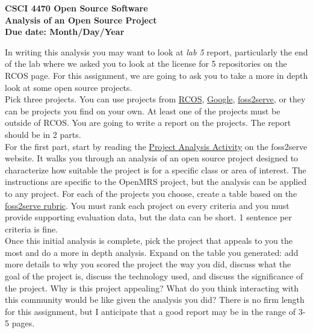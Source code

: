 \documentclass[12pt]{article}
\begin{document}
\begin{center}
\large
\textbf{CSCI 4470 Open Source Software}\\
\textbf{Analysis of an Open Source Project}\\
\textbf{Due date: Month/Day/Year}\\
\end{center}

In writing this analysis you may want to look at \textit{lab 5} report, particularly the end of the lab 
where we asked you to look at the license for 5 repositories on the RCOS page. For this assignment, 
we are going to ask you to take a more in depth look at some open source projects. \\

Pick three projects. You can use projects from \href{https://new.rcos.io}{RCOS}, 
\href{https://opensource.google/projects/}{Google}, \href{http://foss2serve.org/index.php/HFOSS_Projects}{foss2serve}, 
or they can be projects you find on your own. At least one of the projects must be outside of RCOS. 
You are going to write a report on the projects. The report should be in 2 parts. \\

For the first part, start by reading the \href{http://foss2serve.org/index.php/Project_Evaluation_(Activity)}{Project Analysis Activity}
on the foss2serve website. It walks you through an analysis of an open source project designed 
to characterize how suitable the project is for a specific class or area of interest. 
The instructions are specific to the OpenMRS project, but the analysis can be applied to any 
project. For each of the projects you choose, create a table based on the \href{http://foss2serve.org/index.php/Project_Evaluation_Rubric_(Activity)}{foss2serve rubric}. 
You must rank each project on every criteria and you must provide supporting evaluation data, 
but the data can be short. 1 sentence per criteria is fine. \\

Once this initial analysis is complete, pick the project that appeals to you the most and do a 
more in depth analysis. Expand on the table you generated: add more details to why you scored 
the project the way you did, discuss what the goal of the project is, discuss the technology 
used, and discuss the significance of the project. Why is this project appealing? What do you 
think interacting with this community would be like given the analysis you did? There is no firm 
length for this assignment, but I anticipate that a good report may be in the range of 3-5 pages. \\
\end{document}
